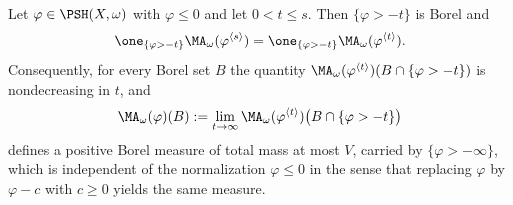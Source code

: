 \begin{lemma}
\label{lem:ch26-layers}
Let $\varphi\in\PSH(X,\omega)$ with $\varphi\leq0$ and let
$0<t\leq s$.  Then $\{\varphi>-t\}$ is Borel and
\begin{equation}
\label{eq:ch26-layer-consistency}
 \one_{\{\varphi>-t\}}\MA_\omega(\varphi^{\langle s\rangle})
 =\one_{\{\varphi>-t\}}\MA_\omega(\varphi^{\langle t\rangle}).
\end{equation}
Consequently, for every Borel set $B$ the quantity
$\MA_\omega(\varphi^{\langle t\rangle})(B\cap\{\varphi>-t\})$ is
nondecreasing in $t$, and
\begin{equation}
\label{eq:ch26-npp-definition}
 \MA_\omega(\varphi)(B)
 :=\lim_{t\to\infty}
  \MA_\omega(\varphi^{\langle t\rangle})
   \bigl(B\cap\{\varphi>-t\}\bigr)
\end{equation}
defines a positive Borel measure of total mass at most $V$, carried by
$\{\varphi>-\infty\}$, which is independent of the normalization
$\varphi\leq0$ in the sense that replacing $\varphi$ by $\varphi-c$
with $c\geq0$ yields the same measure.
\end{lemma}


